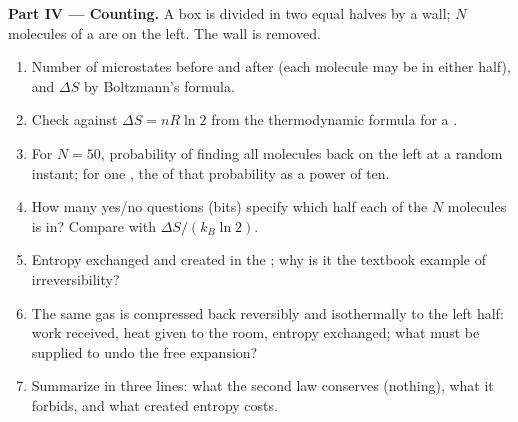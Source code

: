 \begin{problem}
\medskip
\noindent\textbf{Part IV --- Counting.}
A box is divided in two equal halves by a wall; $N$ molecules of a
 are on the left. The wall is removed.
\begin{enumerate}[resume]
  \item Number of microstates before and after (each molecule may be in
        either half), and $\Delta S$ by Boltzmann's formula.
  \item Check against $\Delta S = nR\ln2$ from the thermodynamic formula
        for a .
  \item For $N = 50$, probability of finding all molecules back on the
        left at a random instant; for one , the  of
        that probability as a power of ten.
  \item How many yes/no questions (bits) specify which half each of the
        $N$ molecules is in? Compare with $\Delta S/(k_B\ln2)$.
  \item Entropy exchanged and created in the ; why is it
        the textbook example of irreversibility?
  \item The same gas is compressed back reversibly and isothermally to the
        left half: work received, heat given to the room, entropy
        exchanged; what must be supplied to undo the free expansion?
  \item Summarize in three lines: what the second law conserves
        (nothing), what it forbids, and what created entropy costs.
\end{enumerate}
\end{problem}
